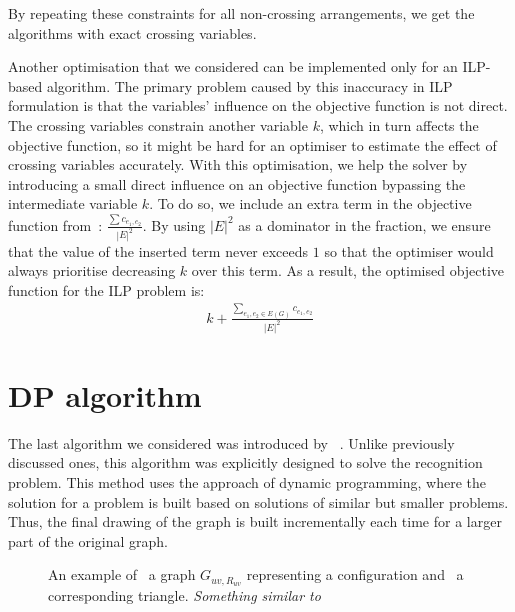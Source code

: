 By repeating these constraints for all non-crossing arrangements, we get the algorithms with exact crossing variables.

Another optimisation that we considered can be implemented only for an ILP-based algorithm. The primary problem caused by this inaccuracy in ILP formulation is that the variables' influence on the objective function is not direct. The crossing variables constrain another variable \(k\), which in turn affects the objective function, so it might be hard for an optimiser to estimate the effect of crossing variables accurately. With this optimisation, we help the solver by introducing a small direct influence on an objective function bypassing the intermediate variable \(k\). To do so, we include an extra term in the objective function from~: \(\frac{\sum c_{e_1, e_2}}{|E|^2}\). By using \(|E|^2\) as a dominator in the fraction, we ensure that the value of the inserted term never exceeds \(1\) so that the optimiser would always prioritise decreasing \(k\) over this term. As a result, the optimised objective function for the ILP problem is:
\begin{gather*}
    k + \frac{\sum_{e_1, e_2 \in E(G)} c_{e_1, e_2}}{|E|^2}
\end{gather*}


\section{DP algorithm}\label{sec:DP-def}

The last algorithm we considered was introduced by \citeauthor{okp}~\cite{okp}. Unlike previously discussed ones, this algorithm was explicitly designed to solve the recognition problem. This method uses the approach of dynamic programming, where the solution for a problem is built based on solutions of similar but smaller problems. Thus, the final drawing of the graph is built incrementally each time for a larger part of the original graph.

\begin{figure}[tbh]
    \centering
    \captionsetup{subrefformat=parens}
    \hfill
    \caption{
        An example of \protect{}~a graph \(G_{uv, R_{uv}}\) representing a configuration and \protect{}~a corresponding triangle.
        \emph{Something similar to\cite[Figure 4]{okp}}
    }
\end{figure}


